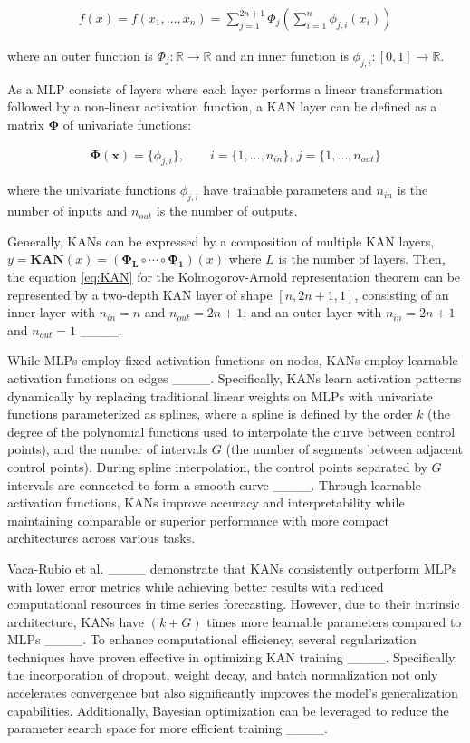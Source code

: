 \begin{align}
f(x) = f(x_{1}, \dots , x_{n}) = \sum_{j=1}^{2n+1} \Phi_j \left( \sum_{i=1}^{n} \phi_{j,i} (x_i) \right) \label{eq:KAN}
\end{align}

where an outer function is $\Phi_j: \mathbb{R} \rightarrow \mathbb{R}$ and an inner function is $\phi_{j,i}: [0,1] \rightarrow \mathbb{R}$. 

As a MLP consists of layers where each layer performs a linear transformation followed by a non-linear activation function, a KAN layer can be defined as a matrix $\mathbf{\Phi}$ of univariate functions:

\begin{align}
\mathbf{\Phi(x)} = \{ \phi_{j,i} \}, \qquad i = \{1, \dots, n_{in}\}, \, j = \{1, \dots, n_{out}\} \label{eq:KAN_layer}
\end{align}

where the univariate functions $\phi_{j,i}$ have trainable parameters and $n_{in}$ is the number of inputs and $n_{out}$ is the number of outputs.

Generally, KANs can be expressed by a composition of multiple KAN layers, $y = \textbf{KAN}(x) = (\mathbf{\Phi_{L}} \circ \cdots \circ \mathbf{\Phi_{1}})(x)$ where $L$ is the number of layers. Then, the equation \ref{eq:KAN} for the Kolmogorov-Arnold representation theorem can be represented by a two-depth KAN layer of shape $[n, 2n + 1, 1]$, consisting of an inner layer with $n_{in} = n$ and $n_{out} = 2n + 1$, and an outer layer with $n_{in} = 2n + 1$ and $n_{out} = 1$ ____.

While MLPs employ fixed activation functions on nodes, KANs employ learnable activation functions on edges ____. Specifically, KANs learn activation patterns dynamically by replacing traditional linear weights on MLPs with univariate functions parameterized as splines, where a spline is defined by the order $k$ (the degree of the polynomial functions used to interpolate the curve between control points), and the number of intervals $G$ (the number of segments between adjacent control points). During spline interpolation, the control points separated by $G$ intervals are connected to form a smooth curve ____. Through learnable activation functions, KANs improve accuracy and interpretability while maintaining comparable or superior performance with more compact architectures across various tasks.

Vaca-Rubio et al. ____ demonstrate that KANs consistently outperform MLPs with lower error metrics while achieving better results with reduced computational resources in time series forecasting. However, due to their intrinsic architecture, KANs have $(k + G)$ times more learnable parameters compared to MLPs ____. To enhance computational efficiency, several regularization techniques have proven effective in optimizing KAN training ____. Specifically, the incorporation of dropout, weight decay, and batch normalization not only accelerates convergence but also significantly improves the model's generalization capabilities. Additionally, Bayesian optimization can be leveraged to reduce the parameter search space for more efficient training ____.